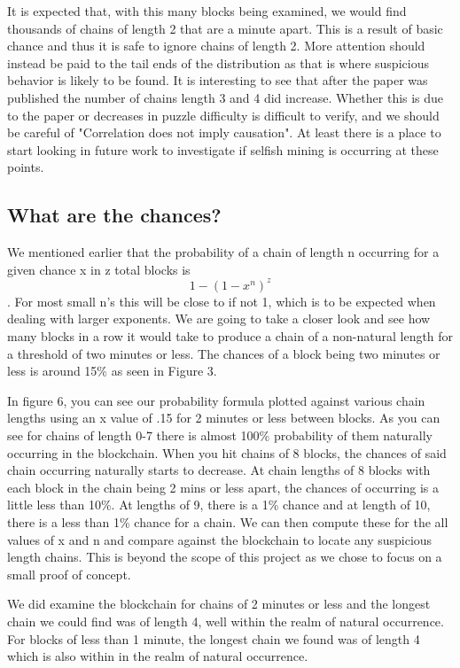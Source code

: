 \documentclass{sig-alternate-05-2015}
\begin{document}
It is expected that, with this many blocks being examined, we would find thousands of chains of length 2 that are a minute apart. This is a result of basic chance and thus it is safe to ignore chains of length 2. More attention should instead be paid to the tail ends of the distribution as that is where suspicious behavior is likely to be found. It is interesting to see that after the paper was published the number of chains length 3 and 4 did increase. Whether this is due to the paper or decreases in puzzle difficulty is difficult to verify, and we should be careful of "Correlation does not imply causation". At least there is a place to start looking in future work to investigate if selfish mining is occurring at these points. 

\subsection{What are the chances?}
We mentioned earlier that the probability of a chain of length n occurring for a given chance x in z total blocks is \[1-(1-x^n)^{z}\]. For most small n's this will be close to if not 1, which is to be expected when dealing with larger exponents. We are going to take a closer look and see how many blocks in a row it would take to produce a chain of a non-natural length for a threshold of two minutes or less. The chances of a block being two minutes or less is around 15\% as seen in Figure 3. 

In figure 6, you can see our probability formula plotted against various chain lengths using an x value of .15 for 2 minutes or less between blocks. As you can see for chains of length 0-7 there is almost 100\% probability of them naturally occurring in the blockchain. When you hit chains of 8 blocks, the chances of said chain occurring naturally starts to decrease. At chain lengths of 8 blocks with each block in the chain being 2 mins or less apart, the chances of occurring is a little less than 10\%. At lengths of 9, there is a 1\% chance and at length of 10, there is a less than 1\% chance for a chain. We can then compute these for the all values of x and n and compare against the blockchain to locate any suspicious length chains. This is beyond the scope of this project as we chose to focus on a small proof of concept. 

We did examine the blockchain for chains of 2 minutes or less and the longest chain we could find was of length 4, well within the realm of natural occurrence. For blocks of less than 1 minute, the longest chain we found was of length 4 which is also within in the realm of natural occurrence.     
\end{document}
